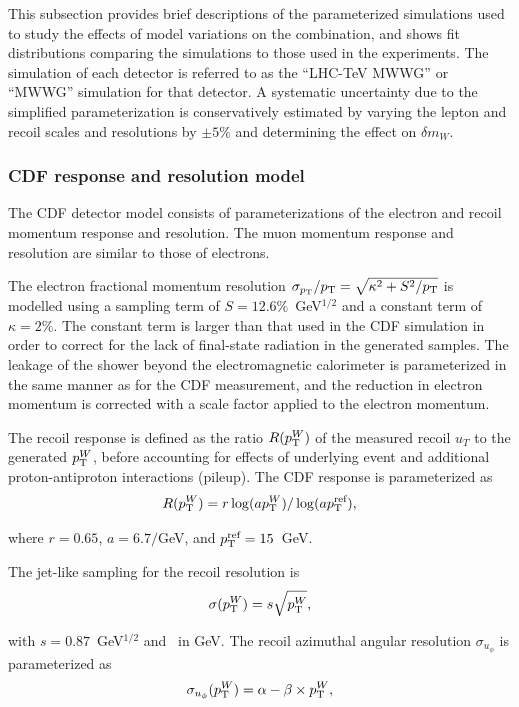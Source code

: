 
This subsection provides brief descriptions of the parameterized simulations used to study 
the effects of model variations on the combination, and shows fit distributions comparing the 
simulations to those used in the experiments.  The simulation of each detector is referred to 
as the ``LHC-TeV MWWG'' or ``MWWG'' simulation for that detector.  A systematic uncertainty due to
the simplified parameterization is conservatively estimated by varying the lepton and recoil scales 
and resolutions by $\pm 5$\% and determining the effect on $\delta m_W$.

\subsubsection{CDF response and resolution model}

The CDF detector model consists of parameterizations of the electron and recoil momentum response 
and resolution.  The muon momentum response and resolution are similar to those of electrons. 

The electron fractional momentum resolution $\sigma_{p_{\tiny\textrm{T}}}/p_{\scriptsize\textrm{T}} = \sqrt{\kappa^2 + S^2/p_{\scriptsize\textrm{T}}}$ is modelled using
a sampling term of $S=12.6\%$~GeV$^{1/2}$ and a constant term of $\kappa=2\%$.  The constant term 
is larger than that used in the CDF simulation in order to correct for the lack of final-state radiation 
in the generated samples.  The leakage of the shower beyond the electromagnetic calorimeter is parameterized 
in the same manner as for the CDF measurement, and the reduction in electron momentum is corrected with a
scale factor applied to the electron momentum.

The recoil response is defined as the ratio $R(p_{\scriptsize\textrm{T}}^{W})$ of the measured recoil $u_T$ to the generated $p_{\scriptsize\textrm{T}}^{W}$,
before accounting for effects of underlying event and additional proton-antiproton interactions (pileup).   
The CDF response is parameterized as 
\begin{equation}
R(p_{\scriptsize\textrm{T}}^{W}) = r \log(a p_{\scriptsize\textrm{T}}^{W})/ \log(a p_{\scriptsize\textrm{T}}^{\scriptsize\textrm{ref}}),
\end{equation}

\noindent
where 
$r=0.65$, $a=6.7/$GeV, and $p_{\scriptsize\textrm{T}}^{\scriptsize\textrm{ref}} = 15$~GeV.  

The jet-like sampling for the recoil resolution is 
\begin{equation}
\sigma(p_{\scriptsize\textrm{T}}^{W}) = s \sqrt{p_{\scriptsize\textrm{T}}^{W}}, 
\end{equation}

\noindent
with 
$s=0.87$~GeV$^{1/2}$ and \pTW~in GeV. 
The recoil azimuthal angular resolution $\sigma_{u_\phi}$ is parameterized as 
\begin{equation}
\sigma_{u_\phi}(p_{\scriptsize\textrm{T}}^{W})  = \alpha - \beta \times p_{\scriptsize\textrm{T}}^{W},
\end{equation}

